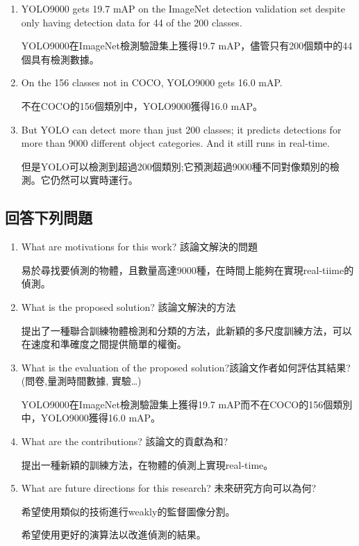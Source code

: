 \begin{enumerate}
\item YOLO9000 gets 19.7 mAP on the ImageNet detection validation set despite only having detection data for 44 of the 200 classes. 

YOLO9000在ImageNet檢測驗證集上獲得19.7 mAP，儘管只有200個類中的44個具有檢測數據。


\item On the 156 classes not in COCO, YOLO9000 gets 16.0 mAP. 

不在COCO的156個類別中，YOLO9000獲得16.0 mAP。

\item But YOLO can detect more than just 200 classes; it predicts detections for more than 9000 different object categories. And it still runs in real-time.

但是YOLO可以檢測到超過200個類別;它預測超過9000種不同對像類別的檢測。它仍然可以實時運行。

\end{enumerate}



\subsection{回答下列問題}

\begin{enumerate}
\item  What are motivations for this work? 該論文解決的問題  

易於尋找要偵測的物體，且數量高達9000種，在時間上能夠在實現real-tiime的偵測。

\item  What is the proposed solution? 該論文解決的方法

提出了一種聯合訓練物體檢測和分類的方法，此新穎的多尺度訓練方法，可以在速度和準確度之間提供簡單的權衡。

\item  What is the evaluation of the proposed solution?該論文作者如何評估其結果? (問卷,量測時間數據, 實驗…)

YOLO9000在ImageNet檢測驗證集上獲得19.7 mAP而不在COCO的156個類別中，YOLO9000獲得16.0 mAP。

\item  What are the contributions? 該論文的貢獻為和?

提出一種新穎的訓練方法，在物體的偵測上實現real-time。

\item  What are future directions for this research? 未來研究方向可以為何?

希望使用類似的技術進行weakly的監督圖像分割。

希望使用更好的演算法以改進偵測的結果。


\end{enumerate}

